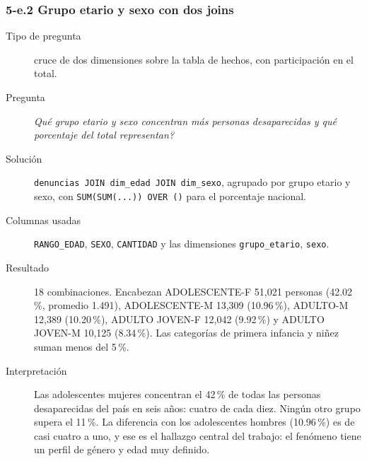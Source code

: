 \subsubsection*{5-e.2 \textbar{} Grupo etario y sexo con dos joins}
\begin{description}
\item[Tipo de pregunta] cruce de dos dimensiones sobre la tabla de hechos, con participaci\'on en
      el total.
\item[Pregunta] \emph{Qu\'e grupo etario y sexo concentran m\'as personas desaparecidas y qu\'e
      porcentaje del total representan?}
\item[Soluci\'on] \texttt{denuncias JOIN dim\_edad JOIN dim\_sexo}, agrupado por grupo etario y
      sexo, con \texttt{SUM(SUM(...)) OVER ()} para el porcentaje nacional.
\item[Columnas usadas] \texttt{RANGO\_EDAD}, \texttt{SEXO}, \texttt{CANTIDAD} y las dimensiones
      \texttt{grupo\_etario}, \texttt{sexo}.
\item[Resultado] 18 combinaciones. Encabezan ADOLESCENTE-F 51,021 personas (42.02\,\%, promedio
      1.491), ADOLESCENTE-M 13,309 (10.96\,\%), ADULTO-M 12,389 (10.20\,\%), ADULTO JOVEN-F
      12,042 (9.92\,\%) y ADULTO JOVEN-M 10,125 (8.34\,\%). Las categor\'ias de primera infancia
      y ni\~nez suman menos del 5\,\%.
\item[Interpretaci\'on] Las adolescentes mujeres concentran el 42\,\% de todas las personas
      desaparecidas del pa\'is en seis a\~nos: cuatro de cada diez. Ning\'un otro grupo supera el
      11\,\%. La diferencia con los adolescentes hombres (10.96\,\%) es de casi cuatro a uno, y
      ese es el hallazgo central del trabajo: el fen\'omeno tiene un perfil de g\'enero y edad
      muy definido.
\end{description}

